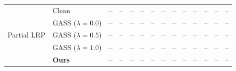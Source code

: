 \begin{table}[t]
{\begin{tabular}{ll|cccc|cccc|cccc}
\multirow{5}{*}{Partial LRP}
& Clean & -- & -- & -- & -- & -- & -- & -- & -- & -- & -- & -- & -- \\
& GASS ($\lambda=0.0$) & -- & -- & -- & -- & -- & -- & -- & -- & -- & -- & -- & -- \\
& GASS ($\lambda=0.5$) & -- & -- & -- & -- & -- & -- & -- & -- & -- & -- & -- & -- \\
& GASS ($\lambda=1.0$) & -- & -- & -- & -- & -- & -- & -- & -- & -- & -- & -- & -- \\
& \textbf{Ours} & -- & -- & -- & -- & -- & -- & -- & -- & -- & -- & -- & -- \\

\bottomrule
\end{tabular}
}
\end{table}
